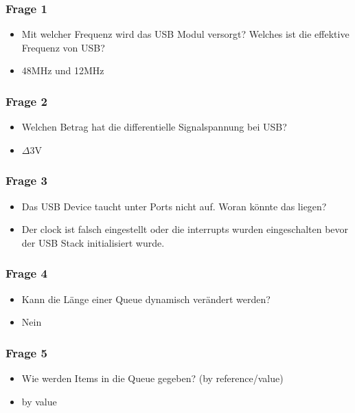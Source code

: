 \documentclass{beamer}
\begin{document}
	\begin{frame}
		\frametitle{Frage 1}
		\begin{itemize}
			\item<1-> Mit welcher Frequenz wird das USB Modul versorgt? Welches ist die effektive Frequenz von USB?
			\item<2-> 48MHz und 12MHz
		\end{itemize}
	\end{frame}
	\begin{frame}
		\frametitle{Frage 2}
		\begin{itemize}
			\item<1-> Welchen Betrag hat die differentielle Signalspannung bei USB?
			\item<2-> $\Delta$3V	
		\end{itemize}
	\end{frame}
	\begin{frame}
		\frametitle{Frage 3}
		\begin{itemize}
			\item<1-> Das USB Device taucht unter Ports nicht auf. Woran könnte das liegen?
			\item<2-> Der clock ist falsch eingestellt oder die interrupts wurden eingeschalten bevor der USB Stack initialisiert wurde.
		\end{itemize}
	\end{frame}
	\begin{frame}
		\frametitle{Frage 4}
		\begin{itemize}
			\item<1-> Kann die Länge einer Queue dynamisch verändert werden?
 			\item<2-> Nein
		\end{itemize}
	\end{frame}
	\begin{frame}
		\frametitle{Frage 5}
		\begin{itemize}
			\item<1-> Wie werden Items in die Queue gegeben? (by reference/value)
			\item<2-> by value
		\end{itemize}
	\end{frame}
\end{document}
